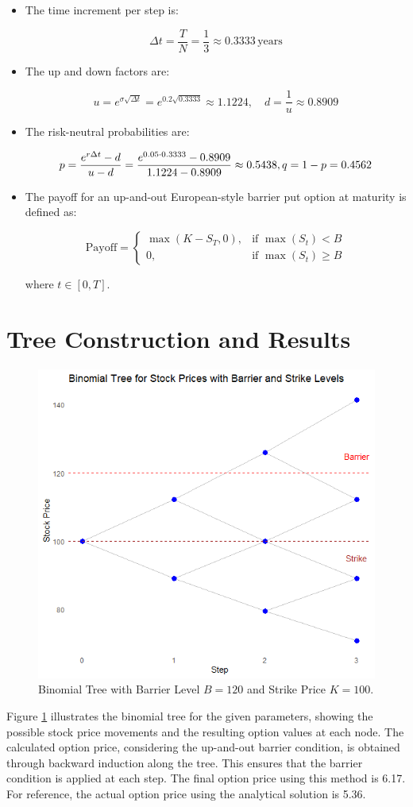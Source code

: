 \begin{itemize}
    \item The time increment per step is:
    
    \[
    \Delta t = \frac{T}{N} = \frac{1}{3} \approx 0.3333 \, \text{years}
    \]

    \item The up and down factors are:
    
    \[
    u = e^{\sigma \sqrt{\Delta t}} = e^{0.2 \sqrt{0.3333}} \approx 1.1224, \quad d = \frac{1}{u} \approx 0.8909
    \]

    \item The risk-neutral probabilities are:
    
    \[
    p = \frac{e^{r \Delta t} - d}{u - d} = \frac{e^{0.05 \cdot 0.3333} - 0.8909}{1.1224 - 0.8909} \approx 0.5438, \\ q = 1 - p = 0.4562
    \]

    \item The payoff for an up-and-out European-style barrier put option at maturity is defined as:

    \[ 
    \text{Payoff} = 
    \begin{cases} 
    \max(K - S_T, 0), & \text{if } \max(S_t) < B \\ 
    0, & \text{if } \max(S_t) \geq B 
    \end{cases}
    \]

    where \(t \in [0, T]\).
    
\end{itemize}


\section{Tree Construction and Results}
\begin{figure}[h]
    \centering
    \includegraphics[width=.55\linewidth]{content/images/three-step.png}
    \caption{Binomial Tree with Barrier Level \(B = 120\) and Strike Price \(K = 100\).}
    \label{fig:binomial-tree}
\end{figure}
Figure \ref{fig:binomial-tree} illustrates the binomial tree for the given parameters, showing the possible stock price movements and the resulting option values at each node. The calculated option price, considering the up-and-out barrier condition, is obtained through backward induction along the tree. This ensures that the barrier condition is applied at each step. The final option price using this method is 6.17. For reference, the actual option price using the analytical solution is 5.36.


